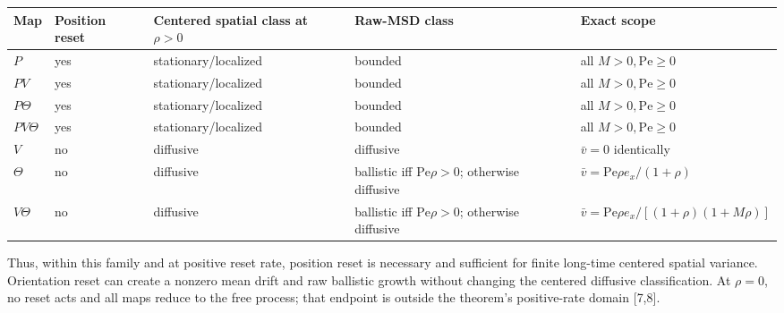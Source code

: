 {\def\LTcaptype{none} %
\begin{longtable}[]{@{}
  >{\raggedright\arraybackslash}p{}
  >{\raggedleft\arraybackslash}p{}
  >{\raggedright\arraybackslash}p{}
  >{\raggedright\arraybackslash}p{}
  >{\raggedright\arraybackslash}p{}@{}}
\toprule\noalign{}
\begin{minipage}[b]{\linewidth}\raggedright
Map
\end{minipage} & \begin{minipage}[b]{\linewidth}\raggedleft
Position reset
\end{minipage} & \begin{minipage}[b]{\linewidth}\raggedright
Centered spatial class at \(\rho>0\)
\end{minipage} & \begin{minipage}[b]{\linewidth}\raggedright
Raw-MSD class
\end{minipage} & \begin{minipage}[b]{\linewidth}\raggedright
Exact scope
\end{minipage} \\
\midrule\noalign{}
\endhead
\bottomrule\noalign{}
\endlastfoot
\(P\) & yes & stationary/localized & bounded & all \(M>0,\mathrm{Pe}\ge0\) \\
\(PV\) & yes & stationary/localized & bounded & all \(M>0,\mathrm{Pe}\ge0\) \\
\(P\Theta\) & yes & stationary/localized & bounded & all \(M>0,\mathrm{Pe}\ge0\) \\
\(PV\Theta\) & yes & stationary/localized & bounded & all \(M>0,\mathrm{Pe}\ge0\) \\
\(V\) & no & diffusive & diffusive & \(\bar v=0\) identically \\
\(\Theta\) & no & diffusive & ballistic iff \(\mathrm{Pe}\rho>0\); otherwise diffusive & \(\bar v=\mathrm{Pe}\rho e_x/(1+\rho)\) \\
\(V\Theta\) & no & diffusive & ballistic iff \(\mathrm{Pe}\rho>0\); otherwise diffusive & \(\bar v=\mathrm{Pe}\rho e_x/[(1+\rho)(1+M\rho)]\) \\
\end{longtable}
}

Thus, within this family and at positive reset rate, position reset is necessary and sufficient for finite long-time centered spatial variance. Orientation reset can create a nonzero mean drift and raw ballistic growth without changing the centered diffusive classification. At \(\rho=0\), no reset acts and all maps reduce to the free process; that endpoint is outside the theorem's positive-rate domain {[}7,8{]}.

